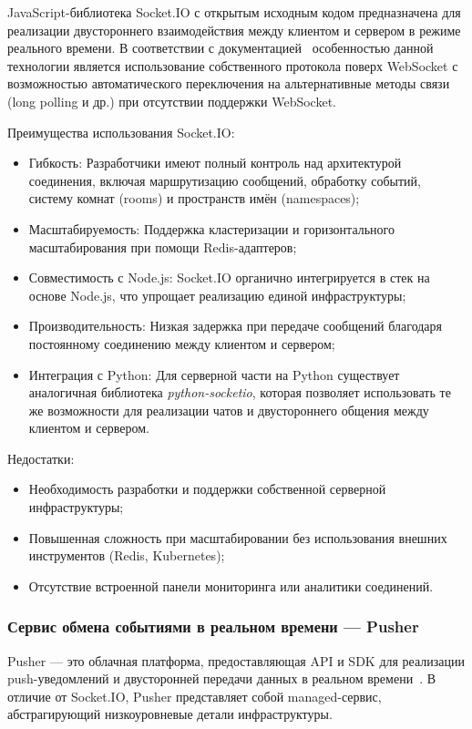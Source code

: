 JavaScript-библиотека Socket.IO с открытым исходным кодом предназначена для реализации двустороннего взаимодействия между клиентом и сервером в режиме реального времени. В соответствии с документацией~\cite{socketio_docs} особенностью данной технологии является использование собственного протокола поверх WebSocket с возможностью автоматического переключения на альтернативные методы связи (long polling и др.) при отсутствии поддержки WebSocket.

Преимущества использования Socket.IO:
\begin{itemize}
  \item Гибкость: Разработчики имеют полный контроль над архитектурой соединения, включая маршрутизацию сообщений, обработку событий, систему комнат (rooms) и пространств имён (namespaces);
  \item Масштабируемость: Поддержка кластеризации и горизонтального масштабирования при помощи Redis-адаптеров;
  \item Совместимость с Node.js: Socket.IO органично интегрируется в стек на основе Node.js, что упрощает реализацию единой инфраструктуры;
  \item Производительность: Низкая задержка при передаче сообщений благодаря постоянному соединению между клиентом и сервером;
  \item Интеграция с Python: Для серверной части на Python существует аналогичная библиотека \textit{python-socketio}, которая позволяет использовать те же возможности для реализации чатов и двустороннего общения между клиентом и сервером.
\end{itemize}

Недостатки:
\begin{itemize}
  \item Необходимость разработки и поддержки собственной серверной инфраструктуры;
  \item Повышенная сложность при масштабировании без использования внешних инструментов (Redis, Kubernetes);
  \item Отсутствие встроенной панели мониторинга или аналитики соединений.
\end{itemize}

\subsubsection*{Сервис обмена событиями в реальном времени — Pusher}

Pusher — это облачная платформа, предоставляющая API и SDK для реализации push-уведомлений и двусторонней передачи данных в реальном времени~\cite{pusher_docs}. В отличие от Socket.IO, Pusher представляет собой managed-сервис, абстрагирующий низкоуровневые детали инфраструктуры.

